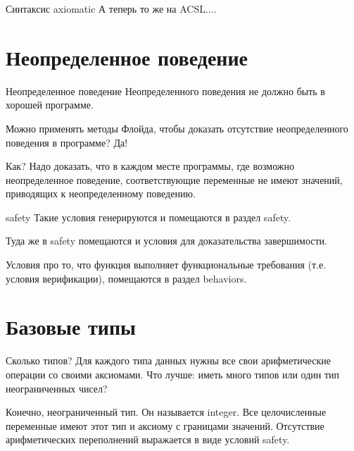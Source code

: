 \documentclass[hyperref={unicode=true}]{beamer}
\begin{document}
    \begin{frame}{Синтаксис axiomatic}
    А теперь то же на ACSL....
    \end{frame}

    \section{Неопределенное поведение}

    \begin{frame}{Неопределенное поведение}
    Неопределенного поведения не должно быть в хорошей программе.

    Можно применять методы Флойда, чтобы доказать отсутствие неопределенного
    поведения в программе? Да!

    Как? Надо доказать, что в каждом месте программы, где возможно
    неопределенное поведение, соответствующие переменные не имеют значений,
    приводящих к неопределенному поведению.
    \end{frame}

    \begin{frame}{safety}
    Такие условия генерируются и помещаются в раздел safety.

    Туда же в safety помещаются и условия для доказательства завершимости.

    Условия про то, что функция выполняет функциональные требования (т.е.
            условия верификации), помещаются в раздел behaviors.
    \end{frame}

    \section{Базовые типы}

    \begin{frame}{Сколько типов?}
    Для каждого типа данных нужны все свои арифметические операции со своими
    аксиомами. Что лучше: иметь много типов или один тип неограниченных чисел?

    Конечно, неограниченный тип. Он называется integer. Все целочисленные
    переменные имеют этот тип и аксиому с границами значений. Отсутствие
    арифметических переполнений выражается в виде условий safety.
    \end{frame}
\end{document}
